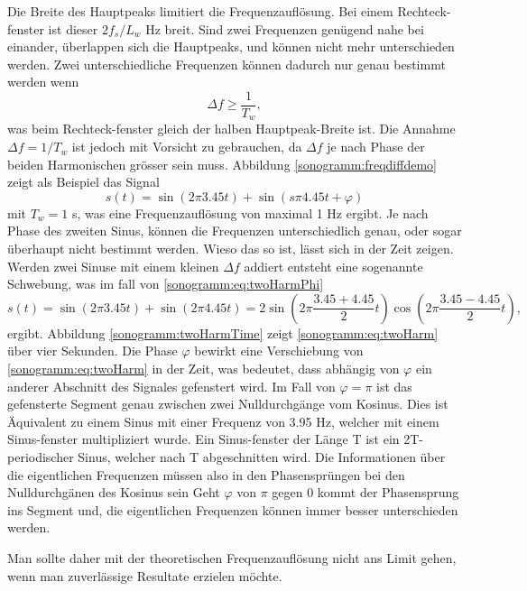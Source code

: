 Die Breite des Hauptpeaks limitiert die Frequenzauflösung.
Bei einem Rechteck-fenster ist dieser $2f_s/L_w$ Hz breit.
Sind zwei Frequenzen genügend nahe bei einander, überlappen sich die Hauptpeaks, und können
nicht mehr unterschieden werden. 
Zwei unterschiedliche Frequenzen können dadurch nur genau bestimmt werden wenn
\begin{equation}
    \Delta f \geq \frac{1}{T_w},
\end{equation}
was beim Rechteck-fenster gleich der halben Hauptpeak-Breite ist.
Die Annahme $\Delta f = 1/T_w$ ist jedoch mit Vorsicht zu gebrauchen, da $\Delta f$ je nach 
Phase der beiden Harmonischen grösser sein muss.
Abbildung \ref{sonogramm:freqdiffdemo} zeigt als Beispiel das Signal
\begin{equation}
    s(t) = \sin(2\pi 3.45 t ) + \sin (s\pi 4.45 t + \varphi)
    \label{sonogramm:eq:twoHarmPhi}
\end{equation}
mit $T_w = 1$ s, was eine Frequenzauflösung von maximal 1 Hz ergibt.
Je nach Phase des zweiten Sinus, können die Frequenzen unterschiedlich genau, oder sogar überhaupt nicht
bestimmt werden.
Wieso das so ist, lässt sich in der Zeit zeigen.
Werden zwei Sinuse mit einem kleinen $\Delta f$ addiert entsteht eine sogenannte Schwebung,
was im fall von \eqref{sonogramm:eq:twoHarmPhi}
\begin{equation}
    s(t) = \sin(2\pi 3.45 t ) + \sin (2\pi 4.45 t) = 2 \sin(2 \pi \frac{3.45 + 4.45}{2}t)
    \cos(2 \pi  \frac{3.45 - 4.45}{2} t),
\label{sonogramm:eq:twoHarm}
\end{equation}
ergibt.
Abbildung \ref{sonogramm:twoHarmTime} zeigt \eqref{sonogramm:eq:twoHarm} über vier Sekunden.
Die Phase $\varphi$ bewirkt eine Verschiebung von \eqref{sonogramm:eq:twoHarm} in der Zeit, 
was bedeutet, dass abhängig von $\varphi$ ein anderer Abschnitt des Signales gefenstert wird.
Im Fall von $\varphi = \pi$ ist das gefensterte Segment genau zwischen zwei Nulldurchgänge
vom Kosinus.
Dies ist Äquivalent zu einem Sinus mit einer Frequenz von 3.95 Hz, welcher mit einem 
Sinus-fenster multipliziert wurde. 
Ein Sinus-fenster der Länge T ist ein 2T-periodischer Sinus, welcher nach T abgeschnitten wird.
Die Informationen über die eigentlichen Frequenzen müssen also in den Phasensprüngen bei den 
Nulldurchgänen des Kosinus sein
Geht $\varphi$ von $\pi$ gegen 0 kommt der Phasensprung ins Segment und, die eigentlichen Frequenzen
können immer besser unterschieden werden.

Man sollte daher mit der theoretischen Frequenzauflösung nicht ans Limit gehen, wenn man
zuverlässige Resultate erzielen möchte.

